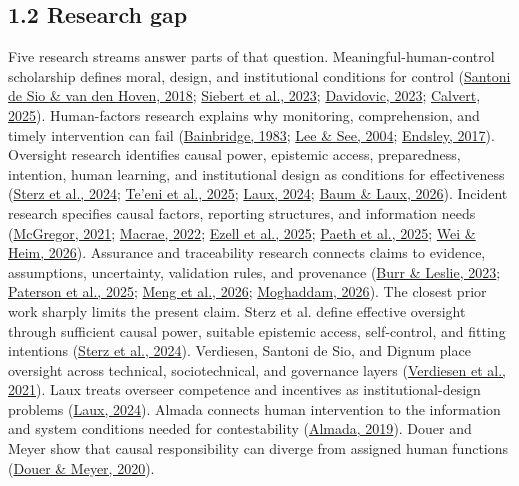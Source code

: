 \documentclass[11pt]{article}
\begin{document}
\subsection*{1.2 Research gap}
Five research streams answer parts of that question. Meaningful-human-control scholarship defines moral, design, and institutional conditions for control (\href{https://doi.org/10.3389/frobt.2018.00015}{Santoni de Sio \& van den Hoven, 2018}; \href{https://doi.org/10.1007/s43681-022-00167-3}{Siebert et al., 2023}; \href{https://doi.org/10.3389/fdata.2022.1017677}{Davidovic, 2023}; \href{https://doi.org/10.1007/s11948-025-00554-z}{Calvert, 2025}). Human-factors research explains why monitoring, comprehension, and timely intervention can fail (\href{https://doi.org/10.1016/0005-1098(83)90046-8}{Bainbridge, 1983}; \href{https://doi.org/10.1518/hfes.46.1.50_30392}{Lee \& See, 2004}; \href{https://doi.org/10.1177/0018720816681350}{Endsley, 2017}). Oversight research identifies causal power, epistemic access, preparedness, intention, human learning, and institutional design as conditions for effectiveness (\href{https://doi.org/10.1145/3630106.3659051}{Sterz et al., 2024}; \href{https://doi.org/10.1007/s00146-025-02401-y}{Te'eni et al., 2025}; \href{https://doi.org/10.1007/s00146-023-01777-z}{Laux, 2024}; \href{https://doi.org/10.48550/arXiv.2603.19213}{Baum \& Laux, 2026}). Incident research specifies causal factors, reporting structures, and information needs (\href{https://doi.org/10.1609/aaai.v35i17.17817}{McGregor, 2021}; \href{https://doi.org/10.1111/risa.13850}{Macrae, 2022}; \href{https://doi.org/10.1609/aies.v8i1.36596}{Ezell et al., 2025}; \href{https://doi.org/10.1609/aaai.v39i28.35163}{Paeth et al., 2025}; \href{https://doi.org/10.1609/aaai.v40i44.41139}{Wei \& Heim, 2026}). Assurance and traceability research connects claims to evidence, assumptions, uncertainty, validation rules, and provenance (\href{https://doi.org/10.1007/s43681-022-00178-0}{Burr \& Leslie, 2023}; \href{https://doi.org/10.1016/j.ress.2025.111311}{Paterson et al., 2025}; \href{https://doi.org/10.48550/arXiv.2605.26340}{Meng et al., 2026}; \href{https://doi.org/10.48550/arXiv.2604.04103}{Moghaddam, 2026}).
The closest prior work sharply limits the present claim. Sterz et al. define effective oversight through sufficient causal power, suitable epistemic access, self-control, and fitting intentions (\href{https://doi.org/10.1145/3630106.3659051}{Sterz et al., 2024}). Verdiesen, Santoni de Sio, and Dignum place oversight across technical, sociotechnical, and governance layers (\href{https://doi.org/10.1007/s11023-020-09532-9}{Verdiesen et al., 2021}). Laux treats overseer competence and incentives as institutional-design problems (\href{https://doi.org/10.1007/s00146-023-01777-z}{Laux, 2024}). Almada connects human intervention to the information and system conditions needed for contestability (\href{https://doi.org/10.1145/3322640.3326699}{Almada, 2019}). Douer and Meyer show that causal responsibility can diverge from assigned human functions (\href{https://doi.org/10.1109/TASE.2020.2965466}{Douer \& Meyer, 2020}).
\end{document}
